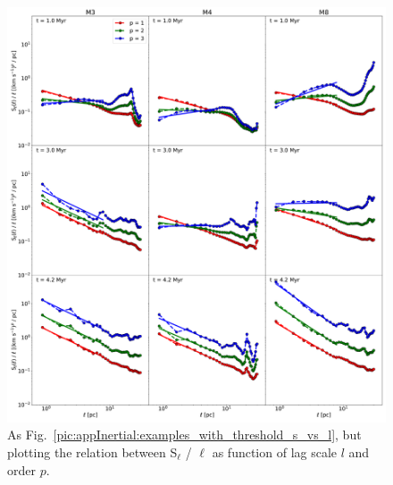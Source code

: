  	
\begin{figure}
    \centering
    \includegraphics[width=\textwidth]{app_examples_wthres_sl_l.pdf}
    \caption{
        As Fig.~\ref{pic:appInertial:examples_with_threshold_s_vs_l}, but plotting the relation between S$_{\ell}$ / $\ell$ as function of lag scale $l$ and order $p$.
    }
    \label{pic:appInertial:examples_with_threshold_sl_vs_l}
\end{figure}
 	
